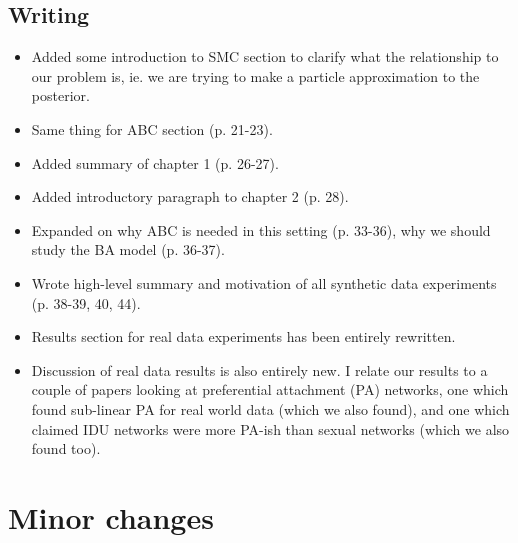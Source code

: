 \documentclass[11pt]{article}
\begin{document}
\subsection*{Writing}

\begin{itemize}
  \item Added some introduction to SMC section to clarify what the relationship
    to our problem is, ie. we are trying to make a particle approximation to
    the posterior.
  \item Same thing for ABC section (p. 21-23).
  \item Added summary of chapter 1 (p. 26-27).
  \item Added introductory paragraph to chapter 2 (p. 28).
  \item Expanded on why ABC is needed in this setting (p. 33-36), why we should
    study the BA model (p. 36-37).
  \item Wrote high-level summary and motivation of all synthetic data
    experiments (p. 38-39, 40, 44).
  \item Results section for real data experiments has been entirely rewritten.
  \item Discussion of real data results is also entirely new. I relate our
    results to a couple of papers looking at preferential attachment (PA)
    networks, one which found sub-linear PA for real world data (which we also
    found), and one which claimed IDU networks were more PA-ish than sexual
    networks (which we also found too).
\end{itemize}

\section*{Minor changes}
\end{document}
